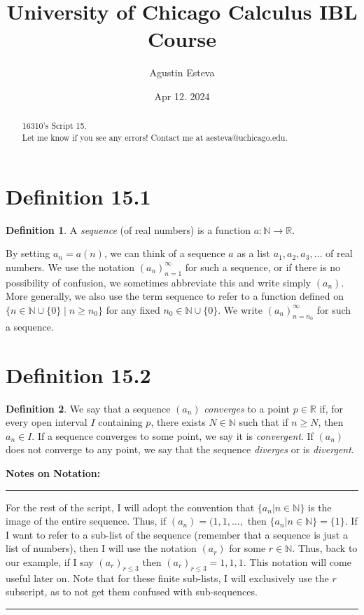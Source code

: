 \documentclass[openany, amssymb, psamsfonts]{amsart}
\title{University of Chicago Calculus IBL Course}
\author{Agustin Esteva}
\date{Apr 12. 2024}
\newcommand{\bbN}{\mathbb{N}}
\newcommand{\bbR}{\mathbb{R}}
\theoremstyle{definition}
\newtheorem{defn}{Definition}[section]
\numberwithin{equation}{section}
\begin{document}
\begin{abstract}

16310's Script 15.\\ Let me know if you see any errors! Contact me at aesteva@uchicago.edu.


\end{abstract}

\maketitle

\tableofcontents

\setcounter{section}{15}

\section*{Definition 15.1}
\begin{defn}
\label{15.1}
	A \emph{sequence} (of real numbers) is a function $a\colon \bbN \to \bbR$.
\end{defn}

By setting $a_n = a(n)$, we can think of a sequence $a$ as a list $a_1, a_2, a_3, \dotsc$ of real numbers.  We use the notation $(a_n)_{n=1}^{\infty}$ for such a sequence, or if there is no possibility of confusion, we sometimes abbreviate this and write simply $(a_n)$.  More generally, we also use the term sequence to refer to a function defined on $\{n \in \bbN\cup\{0\} \mid n\geq n_0\}$ for any fixed $n_0 \in \bbN\cup\{0\}$.  We write $(a_n)_{n = n_{0}}^{\infty}$ for such a sequence.

\section*{Definition 15.2}
\begin{defn}  
\label{15.2}
	We say that a sequence $(a_n)$ \emph{converges} to a point $p \in \bbR$ if, for every open interval $I$ containing $p$, there exists $N\in \bbN$ such that if $n\geq N$, then $a_n\in I$. If a sequence converges to some point, we say it is \emph{convergent}. If $(a_n)$ does not converge to any point, we say that the sequence \emph{diverges} or is \emph{divergent}.
\end{defn}

\textbf{Notes on Notation:}
\vspace{4pt}     \hrule   \vspace{4pt}
For the rest of the script, I will adopt the convention that $\{a_n | n\in \bbN\}$ is the image of the entire sequence. Thus, if $(a_n) = (1,1,\dots,$ then $\{a_n | n\in \bbN\} = \{1\}.$ If I want to refer to a sub-list of the sequence (remember that a sequence is just a list of numbers), then I will use the notation $(a_r)$ for some $r\in \bbN.$ Thus, back to our example, if I say $(a_r)_{r\leq 3}$ then $(a_r)_{r\leq 3}= 1,1,1.$ This notation will come useful later on. Note that for these finite sub-lists, I will exclusively use the $r$ subscript, as to not get them confused with sub-sequences. 
\vspace{4pt}     \hrule   \vspace{4pt}
\end{document}

